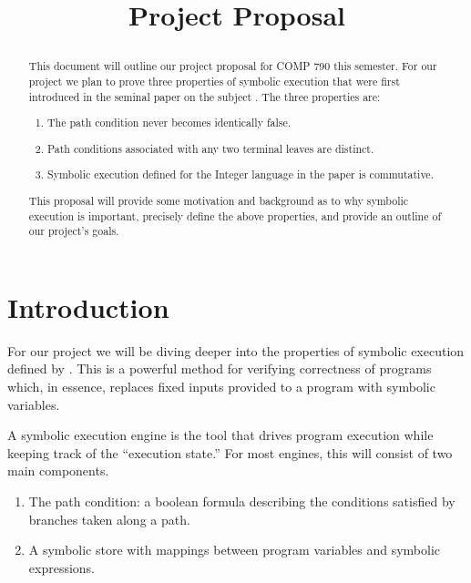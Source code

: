 \documentclass[11pt,conference]{IEEEtran}
\begin{document}
\title{Project Proposal\\


\author{

}}
\maketitle

\begin{abstract}
This document will outline our project proposal for COMP 790 this semester. For our project we plan to prove three properties of symbolic execution that were first introduced in the seminal paper on the subject \cite{b1}. The three properties are:
\begin{enumerate}
    \item The path condition never becomes identically false.
    \item Path conditions associated with any two terminal leaves are distinct. 
    \item Symbolic execution defined for the Integer language in the paper is commutative. 
\end{enumerate}
This proposal will provide some motivation and background as to why symbolic execution is important, precisely define the above properties, and provide an outline of our project's goals.
\end{abstract}

\section{Introduction}

For our project we will be diving deeper into the properties of symbolic execution defined by \cite{b1}. This is a powerful method for verifying correctness of programs which, in essence, replaces fixed inputs provided to a program with symbolic variables.

A symbolic execution engine is the tool that drives program execution while keeping track of the “execution state.” For most engines, this will consist of two main components.

\begin{enumerate}
    \item The path condition: a boolean formula describing the conditions satisfied by branches taken along a path.
    \item A symbolic store with mappings between program variables and symbolic expressions.
\end{enumerate}
\end{document}
